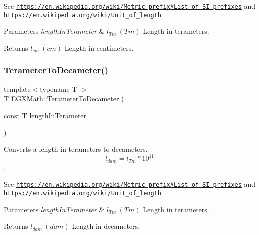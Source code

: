 See \href{https://en.wikipedia.org/wiki/Metric_prefix#List_of_SI_prefixes}{\tt https\+://en.\+wikipedia.\+org/wiki/\+Metric\+\_\+prefix\#\+List\+\_\+of\+\_\+\+S\+I\+\_\+prefixes} and \href{https://en.wikipedia.org/wiki/Unit_of_length}{\tt https\+://en.\+wikipedia.\+org/wiki/\+Unit\+\_\+of\+\_\+length} 
\begin{DoxyParams}{Parameters}
{\em length\+In\+Terameter} & $ l_{Tm}\ (Tm)$ Length in terameters. \\
\hline
\end{DoxyParams}
\begin{DoxyReturn}{Returns}
$ l_{cm}\ (cm)$ Length in centimeters. 
\end{DoxyReturn}
\mbox{\label{group___e_g_x_math-_conversions-_length_conversions-_terameter-_s_i_gae7e3fac4aa8882fee314a52fb4466fd2}} 
\subsubsection{\texorpdfstring{Terameter\+To\+Decameter()}{TerameterToDecameter()}}
{\footnotesize\ttfamily template$<$typename T $>$ \\
T E\+G\+X\+Math\+::\+Terameter\+To\+Decameter (\begin{DoxyParamCaption}\item[{const T}]{length\+In\+Terameter }\end{DoxyParamCaption})}



Converts a length in terameters to decameters. \[ l_{dam}=l_{Tm} * 10^{11} \]. 

See \href{https://en.wikipedia.org/wiki/Metric_prefix#List_of_SI_prefixes}{\tt https\+://en.\+wikipedia.\+org/wiki/\+Metric\+\_\+prefix\#\+List\+\_\+of\+\_\+\+S\+I\+\_\+prefixes} and \href{https://en.wikipedia.org/wiki/Unit_of_length}{\tt https\+://en.\+wikipedia.\+org/wiki/\+Unit\+\_\+of\+\_\+length} 
\begin{DoxyParams}{Parameters}
{\em length\+In\+Terameter} & $ l_{Tm}\ (Tm)$ Length in terameters. \\
\hline
\end{DoxyParams}
\begin{DoxyReturn}{Returns}
$ l_{dam}\ (dam)$ Length in decameters. 
\end{DoxyReturn}
\mbox{\label{group___e_g_x_math-_conversions-_length_conversions-_terameter-_s_i_ga988c084c9508f38112e2e39ed74782d5}} 
